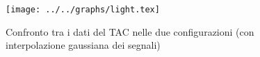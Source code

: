 \begin{figure}[h] \centering\texttt{[image: ../../graphs/light.tex]}\caption{Confronto tra i dati del TAC nelle due configurazioni (con interpolazione gaussiana dei segnali) }\label{gr:light} \end{figure}
